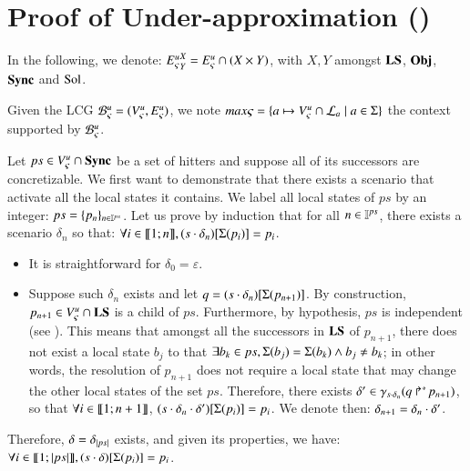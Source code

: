 \section{Proof of Under-approximation ()}
\label{suppl:demoapproxinf}


In the following, we denote:
${E_\varsigma^u}^{X}_{Y} = {E_\varsigma^u} \cap (X \times Y)$, with $X, Y$
amongst $\mathbf{LS}$, $\mathbf{Obj}$, $\mathbf{Sync}$ and $\mathrm{Sol}$.

\begin{proofapproxinf}
Given the LCG ${\mathcal{B}_{\varsigma}^{u}}=(V_\varsigma^u,E_\varsigma^u)$,
we note $max\varsigma = \{a\mapsto V_\varsigma^u\cap\mathcal{L}_a \mid a\in\Sigma\}$ the context supported by ${\mathcal{B}_{\varsigma}^{u}}$.

Let $ps \in {V_\varsigma^u} \cap \mathbf{Sync}$ be a set of hitters
and suppose all of its successors are concretizable.
We first want to demonstrate that
there exists a scenario that activate all the local states it contains.
We label all local states of $ps$ by an integer: $ps = \{ p_n \}_{n \in \mathbb{I}^{ps}}$.
Let us prove by induction that for all $n \in \mathbb{I}^{ps}$, there exists a scenario $\delta_n$ so that:
$\forall i \in \llbracket 1; n \rrbracket, {(s \cdot \delta_n)[\Sigma(p_i)]} = p_i$.
\begin{itemize}
  \item It is straightforward for $\delta_0 = \varepsilon$.
  \item Suppose such $\delta_n$ exists and let $q = {(s \cdot \delta_n)[\Sigma(p_{n+1})]}$.
    By construction, $p_{n+1} \in {V_\varsigma^u} \cap \mathbf{LS}$ is a child of $ps$.
    Furthermore, by hypothesis, $ps$ is independent (see ).
    This means that amongst all the successors in $\mathbf{LS}$ of $p_{n+1}$,
    there does not exist a local state $b_j$ to that
    $\exists b_k \in ps, \Sigma(b_j) = \Sigma(b_k) \wedge b_j \neq b_k$;
    in other words, the resolution of $p_{n+1}$ does not require a local state
    that may change the other local states of the set $ps$.
    Therefore, there exists $\delta' \in \gamma_{s \cdot \delta_n}(\mbox{$q\Rsh^*\!p_{n+1}$})$,
    so that $\forall i \in \llbracket 1; n+1 \rrbracket$, ${(s \cdot \delta_n \cdot \delta')[\Sigma(p_{i})]} = p_{i}$.
    We denote then: $\delta_{n+1} = \delta_n \cdot \delta'$.
\end{itemize}
Therefore, $\delta = \delta_{|ps|}$ exists, and given its properties, we have:
$\forall i \in \llbracket 1; |ps| \rrbracket, {(s \cdot \delta)[\Sigma(p_{i})]} = p_{i}$.


\end{proofapproxinf}
